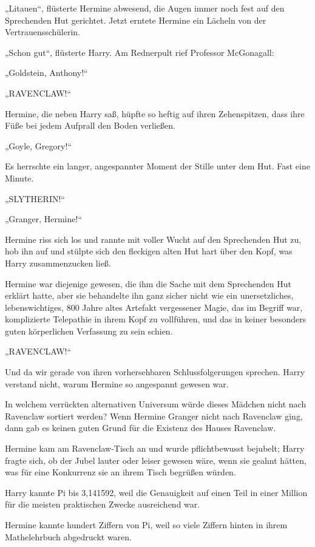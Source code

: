 {„Litauen“, flüsterte Hermine abwesend, die Augen immer noch fest auf den Sprechenden Hut gerichtet. Jetzt erntete Hermine ein Lächeln von der Vertrauensschülerin.

„Schon gut“, flüsterte Harry. Am Rednerpult rief Professor McGonagall:

„Goldstein, Anthony!“

„RAVENCLAW!“

Hermine, die neben Harry saß, hüpfte so heftig auf ihren Zehenspitzen, dass ihre Füße bei jedem Aufprall den Boden verließen.

„Goyle, Gregory!“

Es herrschte ein langer, angespannter Moment der Stille unter dem Hut. Fast eine Minute.

„SLYTHERIN!“

„Granger, Hermine!“

Hermine riss sich los und rannte mit voller Wucht auf den Sprechenden Hut zu, hob ihn auf und stülpte sich den fleckigen alten Hut hart über den Kopf, was Harry zusammenzucken ließ.

Hermine war diejenige gewesen, die ihm die Sache mit dem Sprechenden Hut erklärt hatte, aber sie behandelte ihn ganz sicher nicht wie ein unersetzliches, lebenswichtiges, 800 Jahre altes Artefakt vergessener Magie, das im Begriff war, komplizierte Telepathie in ihrem Kopf zu vollführen, und das in keiner besonders guten körperlichen Verfassung zu sein schien.

„RAVENCLAW!“

Und da wir gerade von ihren vorhersehbaren Schlussfolgerungen sprechen. Harry verstand nicht, warum Hermine so angespannt gewesen war.

In welchem verrückten alternativen Universum würde dieses Mädchen nicht nach Ravenclaw sortiert werden? Wenn Hermine Granger nicht nach Ravenclaw ging, dann gab es keinen guten Grund für die Existenz des Hauses Ravenclaw.

Hermine kam am Ravenclaw-Tisch an und wurde pflichtbewusst bejubelt; Harry fragte sich, ob der Jubel lauter oder leiser gewesen wäre, wenn sie geahnt hätten, was für eine Konkurrenz sie an ihrem Tisch begrüßen würden.

Harry kannte Pi bis 3,141592, weil die Genauigkeit auf einen Teil in einer Million für die meisten praktischen Zwecke ausreichend war.

Hermine kannte hundert Ziffern von Pi, weil so viele Ziffern hinten in ihrem Mathelehrbuch abgedruckt waren.

}
